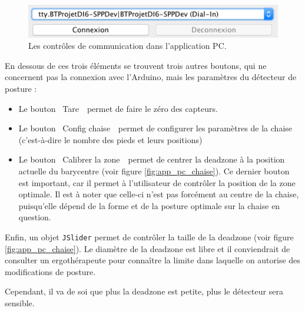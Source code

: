 \documentclass{polytech/polytech}
\begin{document}
\begin{figure}[htbp]
\begin{center}
\includegraphics[width=12cm]{image/app_pc_comms}
\end{center}
\caption{Les contrôles de communication dans l'application PC.}
\label{fig:app_pc_comms}
\end{figure}

En dessous de ces trois éléments se trouvent trois autres boutons, qui ne concernent pas la connexion avec l'Arduino, mais les paramètres du détecteur de posture : 
\begin{itemize}
\item Le bouton \guillemotleft ~Tare~\guillemotright\ permet de faire le zéro des capteurs.
\item Le bouton \guillemotleft ~Config chaise~\guillemotright\ permet de configurer les paramètres de la chaise (c'est-à-dire le nombre des pieds et leurs positions)
\item Le bouton \guillemotleft ~Calibrer la zone~\guillemotright\ permet de centrer la deadzone à la position actuelle du barycentre (voir figure \ref{fig:app_pc_chaise}). Ce dernier bouton est important, car il permet à l'utilisateur de contrôler la position de la zone optimale. 
Il est à noter que celle-ci n'est pas forcément au centre de la chaise, puisqu'elle dépend de la forme et de la posture optimale sur la chaise en question.
\end{itemize}

Enfin, un objet \texttt{JSlider} permet de contrôler la taille de la deadzone (voir figure \ref{fig:app_pc_chaise}). 
Le diamètre de la deadzone est libre et il conviendrait de consulter un ergothérapeute pour connaître la limite dans laquelle on autorise des modifications de posture.

Cependant, il va de soi que plus la deadzone est petite, plus le détecteur sera sensible.

\end{document}
